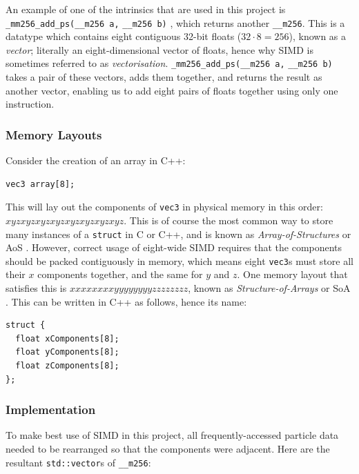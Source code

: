 \documentclass[11pt, a4paper, twocolumn]{article}
\begin{document}
An example of one of the intrinsics that are used in this project is \verb|_mm256_add_ps(|\linebreak[0]\verb|__m256 a,| \verb|__m256 b)| \citep{IntelIntrinsicsAVX}, which returns another \verb|__m256|. This is a datatype which contains eight contiguous 32-bit floats ($32\cdot8=256$), known as a \emph{vector}; literally an eight-dimensional vector of floats, hence why SIMD is sometimes referred to as \emph{vectorisation}. \verb|_mm256_add_ps(|\linebreak[0]\verb|__m256 a,| \verb|__m256 b)| takes a pair of these vectors, adds them together, and returns the result as another vector, enabling us to add eight pairs of floats together using only one instruction.

\subsubsection{Memory Layouts}

Consider the creation of an array in C++:

\begin{verbatim}
vec3 array[8];
\end{verbatim}

This will lay out the components of \verb|vec3| in physical memory in this order: $xyzxyzxyzxyzxyzxyzxyzxyz$. This is of course the most common way to store many instances of a \verb|struct| in C or C++, and is known as \emph{Array-of-Structures} or AoS \citep{JBlowSoA}. However, correct usage of eight-wide SIMD requires that the components should be packed contiguously in memory, which means eight \verb|vec3|s must store all their $x$ components together, and the same for $y$ and $z$. One memory layout that satisfies this is $xxxxxxxxyyyyyyyyzzzzzzzz$, known as \emph{Structure-of-Arrays} or SoA \citep{JBlowSoA}. This can be written in C++ as follows, hence its name:

\begin{verbatim}
struct {
  float xComponents[8];
  float yComponents[8];
  float zComponents[8];
};
\end{verbatim}

\subsubsection{Implementation}

To make best use of SIMD in this project, all frequently-accessed particle data needed to be rearranged so that the components were adjacent. Here are the resultant \verb|std::vector|s of \verb|__m256|:
\end{document}
